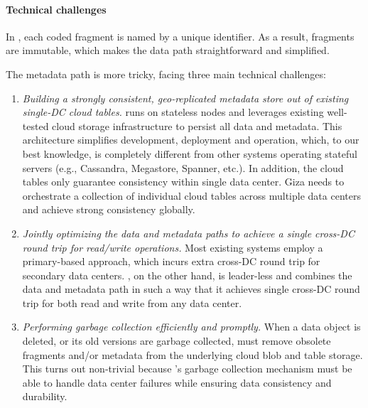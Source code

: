 \paragraph{Technical challenges}
In \name, each coded fragment is named by a unique identifier.
As a result, fragments are immutable, which makes the data path straightforward and simplified. 

The metadata path is more tricky, facing three main technical challenges:
\begin{enumerate}

\item {\it Building a strongly consistent, 
geo-replicated metadata store out of existing single-DC cloud tables.}
\name runs on stateless nodes and leverages existing well-tested
cloud storage infrastructure to persist all data and metadata.
This architecture simplifies development, deployment and operation,
which, to our best knowledge, is completely different from other systems
operating stateful servers (e.g., Cassandra, Megastore, Spanner, etc.).
In addition, the cloud tables only guarantee consistency within single data center.
Giza needs to orchestrate a collection of individual cloud tables across multiple data centers
and achieve strong consistency globally.

\item {\it Jointly optimizing the data and metadata paths to achieve a single
  cross-DC round trip for read/write operations.}
Most existing systems employ a primary-based approach,
which incurs extra cross-DC round trip for secondary data centers.
\name, on the other hand, is leader-less and
combines the data and metadata path in such a way that it achieves
	single cross-DC round trip for both read and write from any data center.

\item {\it Performing garbage collection efficiently and promptly.} When a data
  object is deleted, or its old versions are garbage collected, \name must
  remove obsolete fragments and/or metadata from the underlying cloud blob
	and table storage.
	This turns out non-trivial because \name's
  garbage collection mechanism must be able to handle data center failures while
  ensuring data consistency and durability.

\end{enumerate}


